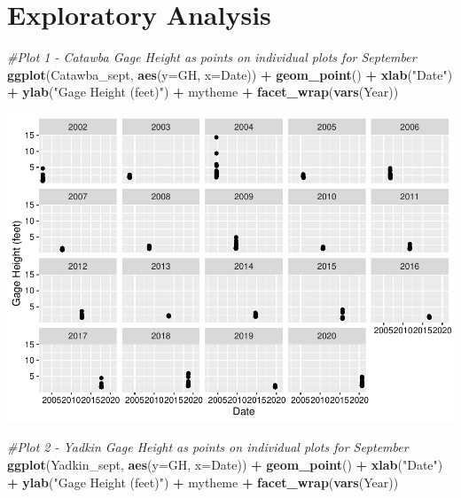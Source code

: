 \documentclass[12pt,]{article}
\newenvironment{Shaded}{\begin{snugshade}}{\end{snugshade}}
\newcommand{\CommentTok}[1]{\textcolor[rgb]{0.56,0.35,0.01}{\textit{#1}}}
\newcommand{\DataTypeTok}[1]{\textcolor[rgb]{0.13,0.29,0.53}{#1}}
\newcommand{\KeywordTok}[1]{\textcolor[rgb]{0.13,0.29,0.53}{\textbf{#1}}}
\newcommand{\NormalTok}[1]{#1}
\newcommand{\OperatorTok}[1]{\textcolor[rgb]{0.81,0.36,0.00}{\textbf{#1}}}
\newcommand{\StringTok}[1]{\textcolor[rgb]{0.31,0.60,0.02}{#1}}
\begin{document}
\newpage

\hypertarget{exploratory-analysis}{%
\section{Exploratory Analysis}\label{exploratory-analysis}}

\begin{Shaded}
\begin{Highlighting}[]
\CommentTok{#Plot 1 - Catawba Gage Height as points on individual plots for September}
\KeywordTok{ggplot}\NormalTok{(Catawba_sept, }\KeywordTok{aes}\NormalTok{(}\DataTypeTok{y=}\NormalTok{GH, }\DataTypeTok{x=}\NormalTok{Date)) }\OperatorTok{+}
\StringTok{  }\KeywordTok{geom_point}\NormalTok{() }\OperatorTok{+}
\StringTok{  }\KeywordTok{xlab}\NormalTok{(}\StringTok{"Date"}\NormalTok{) }\OperatorTok{+}
\StringTok{  }\KeywordTok{ylab}\NormalTok{(}\StringTok{"Gage Height (feet)"}\NormalTok{) }\OperatorTok{+}
\StringTok{  }\NormalTok{mytheme }\OperatorTok{+}
\StringTok{  }\KeywordTok{facet_wrap}\NormalTok{(}\KeywordTok{vars}\NormalTok{(Year)) }
\end{Highlighting}
\end{Shaded}

\includegraphics{Project_Template_files/figure-latex/Plots-1.pdf}

\begin{Shaded}
\begin{Highlighting}[]
\CommentTok{#Plot 2 - Yadkin Gage Height as points on individual plots for September}
\KeywordTok{ggplot}\NormalTok{(Yadkin_sept, }\KeywordTok{aes}\NormalTok{(}\DataTypeTok{y=}\NormalTok{GH, }\DataTypeTok{x=}\NormalTok{Date)) }\OperatorTok{+}
\StringTok{  }\KeywordTok{geom_point}\NormalTok{() }\OperatorTok{+}
\StringTok{  }\KeywordTok{xlab}\NormalTok{(}\StringTok{"Date"}\NormalTok{) }\OperatorTok{+}
\StringTok{  }\KeywordTok{ylab}\NormalTok{(}\StringTok{"Gage Height (feet)"}\NormalTok{) }\OperatorTok{+}
\StringTok{  }\NormalTok{mytheme }\OperatorTok{+}
\StringTok{  }\KeywordTok{facet_wrap}\NormalTok{(}\KeywordTok{vars}\NormalTok{(Year)) }
\end{Highlighting}
\end{Shaded}
\end{document}

